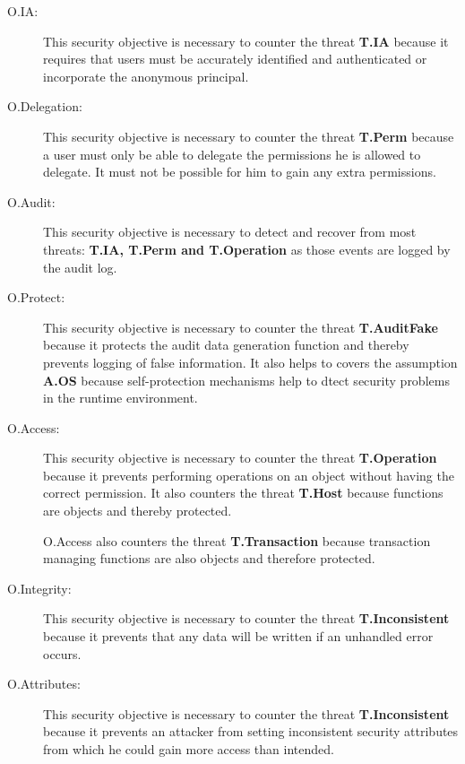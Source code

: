 \documentclass[12pt,english]{scrbook}
\begin{document}
\begin{description}
  
  \item[O.IA:] This security objective is necessary to counter the threat
  \textbf{T.IA} because it requires that users must be accurately identified
  and authenticated or incorporate the anonymous principal.

  \item[O.Delegation:] This security objective is necessary to counter the
  threat \textbf{T.Perm} because a user must only be able to delegate the permissions
  he is allowed to delegate. It must not be possible for him to gain any extra
  permissions.
  
  \item[O.Audit:] This security objective is necessary to detect and recover
    from most threats: \textbf{T.IA, T.Perm and T.Operation} as those events
    are logged by the audit log.
  
  \item[O.Protect:] This security objective is necessary to counter the threat
  \textbf{T.AuditFake} because it protects the audit data generation function
  and thereby prevents logging of false information. It also helps to covers
  the assumption \textbf{A.OS} because self-protection mechanisms help to
  dtect security problems in the runtime environment.
  
  \item[O.Access:] This security objective is necessary to counter the threat
  \textbf{T.Operation} because it prevents performing operations on an object
  without having the correct permission. It also counters the threat
  \textbf{T.Host} because functions are objects and thereby protected.

  O.Access also counters the threat \textbf{T.Transaction} because transaction
  managing functions are also objects and therefore protected.

  \item[O.Integrity:] This security objective is necessary to counter the
    threat \textbf{T.Inconsistent} because it prevents that any data will be
    written if an unhandled error occurs.
  
  \item[O.Attributes:] This security objective is necessary to counter the
    threat \textbf{T.Inconsistent} because it prevents an attacker from
    setting inconsistent security attributes from which he could gain more
    access than intended.


\end{description}
\end{document}
